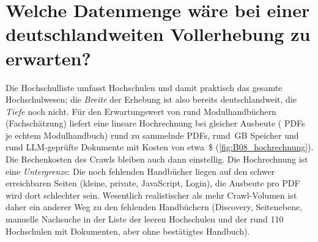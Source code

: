 \section{Welche Datenmenge wäre bei einer deutschlandweiten Vollerhebung zu erwarten?}
Die Hochschulliste umfasst \zUnisTotal{} Hochschulen und damit praktisch das gesamte Hochschulwesen; die \emph{Breite} der Erhebung ist also bereits deutschlandweit, die \emph{Tiefe} noch nicht. Für den Erwartungswert von rund \zZielwert{} Modulhandbüchern (Fachschätzung) liefert eine lineare Hochrechnung bei gleicher Ausbeute (\zPDFsProMH{} PDFs je echtem Modulhandbuch) rund \zPDFsHochrechnung{} zu sammelnde PDFs, rund \zGBHochrechnung{}\,GB Speicher und rund \zLLMDocsHochrechnung{} LLM-geprüfte Dokumente mit Kosten von etwa \zLLMKostenHochrechnung{}\,\$ (\cref{fig:B08_hochrechnung}). Die Rechenkosten des Crawls bleiben auch dann einstellig. Die Hochrechnung ist eine \emph{Untergrenze}: Die noch fehlenden Handbücher liegen auf den schwer erreichbaren Seiten (kleine, private, JavaScript, Login), die Ausbeute pro PDF wird dort schlechter sein. Wesentlich realistischer als mehr Crawl-Volumen ist daher ein anderer Weg zu den fehlenden Handbüchern (Discovery, Seitenebene, manuelle Nachsuche in der Liste der \zUnisNone{} leeren Hochschulen und der rund 110 Hochschulen mit Dokumenten, aber ohne bestätigtes Handbuch).


